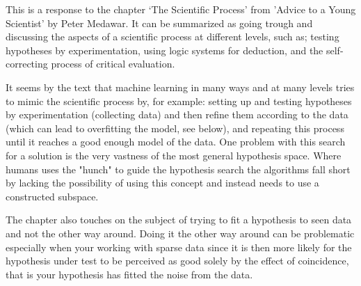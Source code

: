 \documentclass{article}
\begin{document}
    This is a response to the chapter `The Scientific Process' from
    'Advice to a Young Scientist' by Peter Medawar. It can be summarized as going
    trough and discussing the aspects of a scientific process at different
    levels, such as; testing hypotheses by experimentation, using logic 
    systems for deduction, and
    the self-correcting process of critical evaluation.

    It seems by the text that machine learning in many ways and at many levels tries 
    to mimic 
    the scientific process by, for example: setting up and testing hypotheses by
    experimentation (collecting data) and then refine them 
    according to the data (which can lead to overfitting the model, see below), 
    and repeating this process until it reaches a good enough model of the 
    data. One problem with this search for a solution is the very
    vastness of the most general hypothesis space. Where humans uses the 
    "hunch" to guide the hypothesis search the algorithms fall short by lacking 
    the possibility of using this concept and instead needs to use a constructed
    subspace.

    The chapter also touches on the subject of trying to fit a hypothesis 
    to seen data and not the other way around. Doing it the other way around 
    can be problematic especially when your working with sparse data since it 
    is then more likely for the hypothesis under test to be perceived as good 
    solely by the effect of coincidence, that is your hypothesis has fitted the
    noise from the data.
\end{document}
